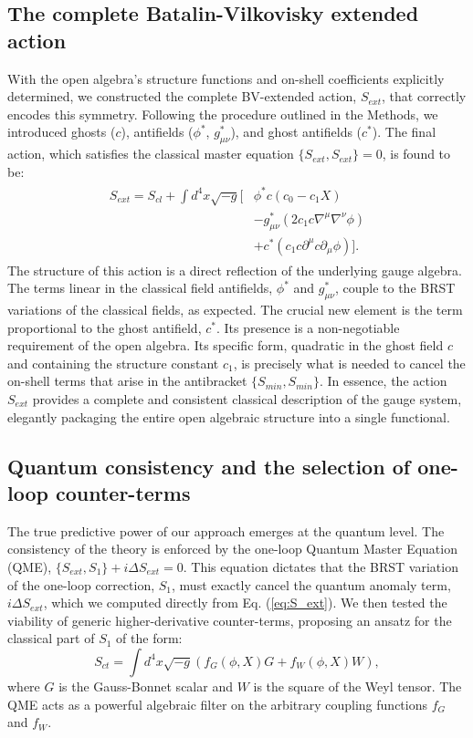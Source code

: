 \documentclass[twocolumn]{aastex631}
\begin{document}
\subsection{The complete Batalin-Vilkovisky extended action}
With the open algebra's structure functions and on-shell coefficients explicitly determined, we constructed the complete BV-extended action, $S_{ext}$, that correctly encodes this symmetry. Following the procedure outlined in the Methods, we introduced ghosts ($c$), antifields ($\phi^*$, $g_{\mu\nu}^*$), and ghost antifields ($c^*$). The final action, which satisfies the classical master equation $\{S_{ext}, S_{ext}\} = 0$, is found to be:
\begin{align}
\begin{split}
    S_{ext} = S_{cl} + \int d^4x \sqrt{-g} \bigg[ &\phi^* c (c_0 - c_1 X) \\
    &- g_{\mu\nu}^* (2 c_1 c \nabla^\mu \nabla^\nu \phi) \\
    &+ c^* (c_1 c \partial^\mu c \partial_\mu \phi) \bigg].
\end{split}
\label{eq:S_ext}
\end{align}
The structure of this action is a direct reflection of the underlying gauge algebra. The terms linear in the classical field antifields, $\phi^*$ and $g_{\mu\nu}^*$, couple to the BRST variations of the classical fields, as expected. The crucial new element is the term proportional to the ghost antifield, $c^*$. Its presence is a non-negotiable requirement of the open algebra. Its specific form, quadratic in the ghost field $c$ and containing the structure constant $c_1$, is precisely what is needed to cancel the on-shell terms that arise in the antibracket $\{S_{min}, S_{min}\}$. In essence, the action $S_{ext}$ provides a complete and consistent classical description of the gauge system, elegantly packaging the entire open algebraic structure into a single functional.

\subsection{Quantum consistency and the selection of one-loop counter-terms}
The true predictive power of our approach emerges at the quantum level. The consistency of the theory is enforced by the one-loop Quantum Master Equation (QME), $\{S_{ext}, S_1\} + i \Delta S_{ext} = 0$. This equation dictates that the BRST variation of the one-loop correction, $S_1$, must exactly cancel the quantum anomaly term, $i\Delta S_{ext}$, which we computed directly from Eq. (\ref{eq:S_ext}). We then tested the viability of generic higher-derivative counter-terms, proposing an ansatz for the classical part of $S_1$ of the form:
\begin{equation}
    S_{ct} = \int d^4x \sqrt{-g} \left( f_G(\phi, X) G + f_W(\phi, X) W \right),
\end{equation}
where $G$ is the Gauss-Bonnet scalar and $W$ is the square of the Weyl tensor. The QME acts as a powerful algebraic filter on the arbitrary coupling functions $f_G$ and $f_W$.
\end{document}
